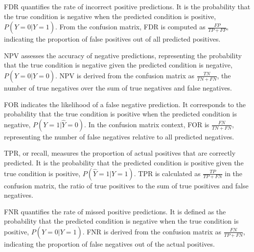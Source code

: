 \begin{definition}\label{def:fdr}
FDR quantifies the rate of incorrect positive predictions. It is the probability that the true condition is negative when the predicted condition is positive, $P(Y=0|\hat{Y}=1)$. From the confusion matrix, FDR is computed as $\frac{FP}{TP + FP}$, indicating the proportion of false positives out of all predicted positives.
\end{definition}

\begin{definition}\label{def:npv}
NPV assesses the accuracy of negative predictions, representing the probability that the true condition is negative given the predicted condition is negative, $P(Y=0|\hat{Y}=0)$. NPV is derived from the confusion matrix as $\frac{TN}{TN + FN}$, the number of true negatives over the sum of true negatives and false negatives.
\end{definition}

\begin{definition}\label{def:for}
FOR indicates the likelihood of a false negative prediction. It corresponds to the probability that the true condition is positive when the predicted condition is negative, $P(Y=1|\hat{Y}=0)$. In the confusion matrix context, FOR is $\frac{FN}{TN + FN}$, representing the number of false negatives relative to all predicted negatives.
\end{definition}

\begin{definition}\label{def:tpr}
TPR, or recall, measures the proportion of actual positives that are correctly predicted. It is the probability that the predicted condition is positive given the true condition is positive, $P(\hat{Y}=1|Y=1)$. TPR is calculated as $\frac{TP}{TP + FN}$ in the confusion matrix, the ratio of true positives to the sum of true positives and false negatives.
\end{definition}

\begin{definition}\label{def:fnr}
FNR quantifies the rate of missed positive predictions. It is defined as the probability that the predicted condition is negative when the true condition is positive, $P(\hat{Y}=0|Y=1)$. FNR is derived from the confusion matrix as $\frac{FN}{TP + FN}$, indicating the proportion of false negatives out of the actual positives.
\end{definition}

